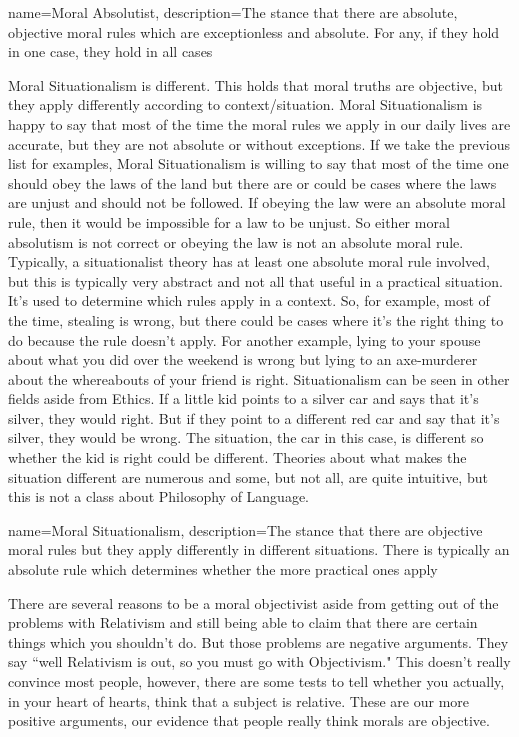 {
  name=Moral Absolutist,
  description={The stance that there are absolute, objective moral rules which are exceptionless and absolute. For any, if they hold in one case, they hold in all cases}
}


Moral Situationalism is different. This holds that moral truths are objective, but they apply differently according to context/situation. \gls{Moral Situationalism} is happy to say that most of the time the moral rules we apply in our daily lives are accurate, but they are not absolute or without exceptions. If we take the previous list for examples, Moral Situationalism is willing to say that most of the time one should obey the laws of the land but there are or could be cases where the laws are unjust and should not be followed. If obeying the law were an absolute moral rule, then it would be impossible for a law to be unjust. So either moral absolutism is not correct or obeying the law is not an absolute moral rule. Typically, a situationalist theory has at least one absolute moral rule involved, but this is typically very abstract and not all that useful in a practical situation. It’s used to determine which rules apply in a context. So, for example, most of the time, stealing is wrong, but there could be cases where it’s the right thing to do because the rule doesn’t apply. For another example, lying to your spouse about what you did over the weekend is wrong but lying to an axe-murderer about the whereabouts of your friend is right. Situationalism can be seen in other fields aside from Ethics. If a little kid points to a silver car and says that it’s silver, they would right. But if they point to a different red car and say that it’s silver, they would be wrong. The situation, the car in this case, is different so whether the kid is right could be different. Theories about what makes the situation different are numerous and some, but not all, are quite intuitive, but this is not a class about Philosophy of Language.

{
  name=Moral Situationalism,
  description={The stance that there are objective moral rules but they apply differently in different situations. There is typically an absolute rule which determines whether the more practical ones apply}
}


There are several reasons to be a moral objectivist aside from getting out of the problems with Relativism and still being able to claim that there are certain things which you shouldn't do. But those problems are negative arguments. They say ``well Relativism is out, so you must go with Objectivism." This doesn't really convince most people, however, there are some tests to tell whether you actually, in your heart of hearts, think that a subject is relative. These are our more positive arguments, our evidence that people really think morals are objective.

